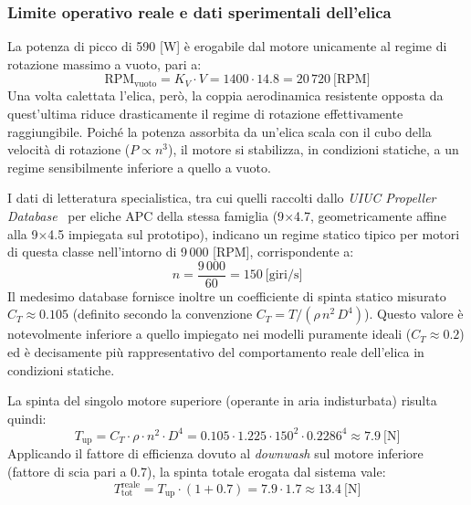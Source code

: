 \documentclass[11pt]{report}
\begin{document}
	\subsubsection*{Limite operativo reale e dati sperimentali dell'elica}
	La potenza di picco di 590 [W] è erogabile dal motore unicamente al regime di rotazione massimo a vuoto, pari a:
	\begin{equation}
		\text{RPM}_\text{vuoto} = K_V \cdot V = 1400 \cdot 14.8 = 20\,720\ \text{[RPM]}
		\label{eq:rpm_vuoto}
	\end{equation}
	Una volta calettata l'elica, però, la coppia aerodinamica resistente opposta da quest'ultima riduce drasticamente il regime di rotazione effettivamente raggiungibile. Poiché la potenza assorbita da un'elica scala con il cubo della velocità di rotazione ($P \propto n^3$), il motore si stabilizza, in condizioni statiche, a un regime sensibilmente inferiore a quello a vuoto.
	
	I dati di letteratura specialistica, tra cui quelli raccolti dallo \textit{UIUC Propeller Database}~\cite{uiuc_propeller_db} per eliche APC della stessa famiglia (9$\times$4.7, geometricamente affine alla 9$\times$4.5 impiegata sul prototipo), indicano un regime statico tipico per motori di questa classe nell'intorno di 9\,000 [RPM], corrispondente a:
	\begin{equation}
		n = \frac{9\,000}{60} = 150\ \text{[giri/s]}
		\label{eq:rpm_statico}
	\end{equation}
	Il medesimo database fornisce inoltre un coefficiente di spinta statico misurato $C_T \approx 0.105$ (definito secondo la convenzione $C_T = T / (\rho \, n^2 \, D^4)$). Questo valore è notevolmente inferiore a quello impiegato nei modelli puramente ideali ($C_T \approx 0.2$) ed è decisamente più rappresentativo del comportamento reale dell'elica in condizioni statiche.
	
	La spinta del singolo motore superiore (operante in aria indisturbata) risulta quindi:
	\begin{equation}
		T_\text{up} = C_T \cdot \rho \cdot n^2 \cdot D^4 = 0.105 \cdot 1.225 \cdot 150^2 \cdot 0.2286^4 \approx 7.9\ \text{[N]}
		\label{eq:spinta_singolo}
	\end{equation}
	Applicando il fattore di efficienza dovuto al \textit{downwash} sul motore inferiore (fattore di scia pari a 0.7), la spinta totale erogata dal sistema vale:
	\begin{equation}
		T_\text{tot}^\text{reale} = T_\text{up} \cdot (1 + 0.7) = 7.9 \cdot 1.7 \approx 13.4\ \text{[N]}
		\label{eq:spinta_reale}
	\end{equation}
	
\end{document}
